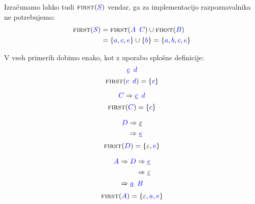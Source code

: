 \documentclass{article}
\newcommand{\FIRST}{\textsc{first}}
\newcommand{\Symbol}[1]{\textcolor{blue}{#1}}
\newcommand{\Null}{\varepsilon}
\newcommand{\Derive}{\Rightarrow}
\newcommand{\Seq}{{\ \,}}
\begin{document}
Izračunamo lahko tudi $\FIRST(\Symbol{S})$ vendar, ga za implementacijo razpoznavalnika ne potrebujemo:
\begin{align*}
  \FIRST(\Symbol{S}) &= \FIRST(\Symbol{A} \Seq \Symbol{C}) \cup \FIRST(\Symbol{B}) \\
            &= \{\Symbol{a}, \Symbol{c}, \Symbol{e}\} \cup \{\Symbol{b}\} = \{\Symbol{a}, \Symbol{b}, \Symbol{c}, \Symbol{e}\}
\end{align*}

V vseh primerih dobimo enako, kot z uporabo splošne definicije:
\begin{equation*}
  \underline{\Symbol{c}} \Seq \Symbol{d}
\end{equation*}
\begin{equation*}
  \FIRST(\Symbol{c} \Seq \Symbol{d}) = \{\Symbol{c}\}
\end{equation*}

\begin{equation*}
  \Symbol{C} \Derive \underline{\Symbol{c}} \Seq \Symbol{d}
\end{equation*}
\begin{equation*}
  \FIRST(\Symbol{C}) = \{\Symbol{c}\}
\end{equation*}

\begin{equation*}
  \Symbol{D} \begin{aligned}[t]
    &\Derive \underline{\Null}\\
    &\Derive \underline{\Symbol{e}}\\
  \end{aligned}
\end{equation*}
\begin{equation*}
  \FIRST(\Symbol{D}) = \{\Null, \Symbol{e}\}
\end{equation*}

\begin{equation*}
  \Symbol{A} \begin{aligned}[t]
    &\Derive \Symbol{D} \begin{aligned}[t]
      &\Derive \underline{\Symbol{e}} \\
      &\Derive \underline{\Null}\\
    \end{aligned}\\
    &\Derive \underline{\Symbol{a}} \Seq \Symbol{B}
  \end{aligned}
\end{equation*}
\begin{equation*}
  \FIRST(\Symbol{A}) = \{\Null, \Symbol{a}, \Symbol{e}\}
\end{equation*}
\end{document}
